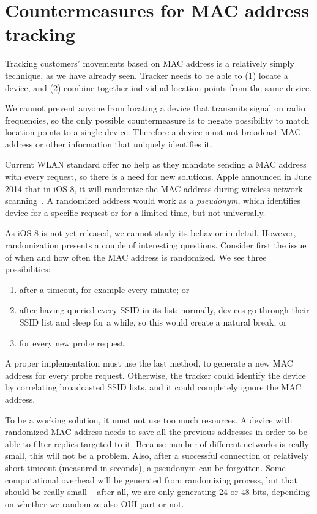 \documentclass[12pt,a4paper,oneside,pdftex]{report}
\begin{document}
\section{Countermeasures for MAC address tracking}

Tracking customers' movements based on MAC address is a relatively simply technique, as we have already seen. Tracker needs to be able to (1) locate a device, and (2) combine together individual location points from the same device.

We cannot prevent anyone from locating a device that transmits signal on radio frequencies, so the only possible countermeasure is to negate possibility to match location points to a single device. Therefore a device must not broadcast MAC address or other information that uniquely identifies it.

Current WLAN standard offer no help as they mandate sending a MAC address with every request, so there is a need for new solutions. Apple announced in June 2014 that in iOS 8, it will randomize the MAC address during wireless network scanning~\cite{FredericJacobs2014,apple_wwdc_privacy}. A randomized address would work as a \emph{pseudonym}, which identifies device for a specific request or for a limited time, but not universally.

As iOS 8 is not yet released, we cannot study its behavior in detail. However, randomization presents a couple of interesting questions. Consider first the issue of when and how often the MAC address is randomized. We see three possibilities:
\begin{enumerate}
    \item after a timeout, for example every minute; or
    \item after having queried every SSID in its list: normally, devices go through their SSID list and sleep for a while, so this would create a natural break; or
    \item for every new probe request.
\end{enumerate}

A proper implementation must use the last method, to generate a new MAC address for every probe request. Otherwise, the tracker could identify the device by correlating broadcasted SSID lists, and it could completely ignore the MAC address.

To be a working solution, it must not use too much resources. A device with randomized MAC address needs to save all the previous addresses in order to be able to filter replies targeted to it. Because number of different networks is really small, this will not be a problem. Also, after a successful connection or relatively short timeout (measured in seconds), a pseudonym can be forgotten. Some computational overhead will be generated from randomizing process, but that should be really small -- after all, we are only generating 24 or 48 bits, depending on whether we randomize also OUI part or not.
\end{document}
